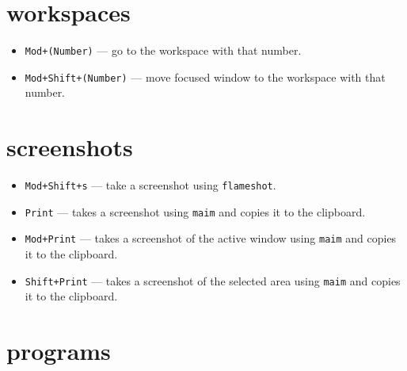 \documentclass{article}
\begin{document}
\section*{workspaces}

\vspace*{-.5\baselineskip}
\begin{itemize}
  \item \texttt{Mod+(Number)} --- go to the workspace with that number.
  \item \texttt{Mod+Shift+(Number)} --- move focused window to the workspace with that number.
\end{itemize}

\section*{screenshots}

\vspace*{-.5\baselineskip}
\begin{itemize}
  \item \texttt{Mod+Shift+s} --- take a screenshot using \texttt{flameshot}.
  \item \texttt{Print} --- takes a screenshot using \texttt{maim} and copies it to the clipboard.
  \item \texttt{Mod+Print} --- takes a screenshot of the active window using \texttt{maim} and copies it to the clipboard.
  \item \texttt{Shift+Print} --- takes a screenshot of the selected area using \texttt{maim} and copies it to the clipboard.
\end{itemize}

\section*{programs}
\end{document}
